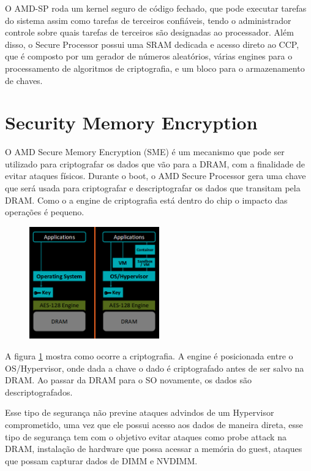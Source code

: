 \documentclass{report}
\newcommand{\todo}[1]{{\color{red} #1}}
\begin{document}
O AMD-SP roda um kernel seguro de código fechado, que pode executar tarefas do
sistema assim como tarefas de terceiros confiáveis, tendo o administrador
controle sobre quais tarefas de terceiros são designadas ao processador. Além
disso, o Secure Processor possui uma SRAM dedicada e acesso direto ao CCP, que
é composto por um gerador de números aleatórios, várias engines para o
processamento de algoritmos de criptografia, e um bloco para o armazenamento de
chaves.

\section{Security Memory Encryption}
O AMD Secure Memory Encryption (SME) é um mecanismo que pode ser utilizado para
criptografar os dados que vão para a DRAM, com a finalidade de evitar ataques
físicos. Durante o boot, o AMD Secure Processor gera uma chave que será usada
para criptografar e descriptografar os dados que transitam pela DRAM. Como o a
engine de criptografia está dentro do chip o impacto das operações é pequeno.

\begin{figure}[h]
    \centering
    \includegraphics[width=0.5\textwidth]{img/sme}
    \label{sme-1}
\end{figure}

A figura \ref{sme-1} mostra como ocorre a criptografia. A engine é posicionada entre
o OS/Hypervisor, onde dada a chave o dado é criptografado antes de ser salvo na
DRAM. Ao passar da DRAM para o SO novamente, os dados são descriptografados.

Esse tipo de segurança não previne ataques advindos de um Hypervisor
comprometido, uma vez que ele possui acesso aos dados de maneira direta, esse
tipo de segurança tem com o objetivo evitar ataques como \todo{probe attack na
DRAM}, instalação de hardware que possa acessar a memória do guest, ataques que
possam capturar dados de DIMM e NVDIMM.
\end{document}
